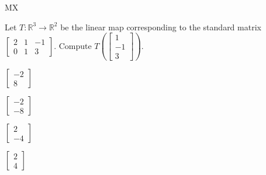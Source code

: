 \documentclass{article}
\newcommand{\IR}{\mathbb{R}}
\begin{document}
\begin{module}{MX}{}
\begin{readinessAssuranceTest}
\item Let \(T: \IR^3 \rightarrow \IR^2\) be the linear map corresponding to the standard matrix \(\begin{bmatrix} 2 & 1 & -1 \\ 0 & 1 & 3  \end{bmatrix} \).  Compute \(T\left(\begin{bmatrix} 1 \\ -1 \\ 3 \end{bmatrix} \right)\).
\begin{multicols}{4}
\begin{readinessAssuranceTestChoices}
\item $\begin{bmatrix}  -2 \\ 8 \end{bmatrix}$ %
\item $\begin{bmatrix} -2 \\ -8  \end{bmatrix}$
\item $\begin{bmatrix} 2 \\ -4 \end{bmatrix}$
\item $\begin{bmatrix}  2 \\ 4 \end{bmatrix}$ 
\end{readinessAssuranceTestChoices}
\end{multicols}


\end{readinessAssuranceTest}
\end{module}
\end{document}
